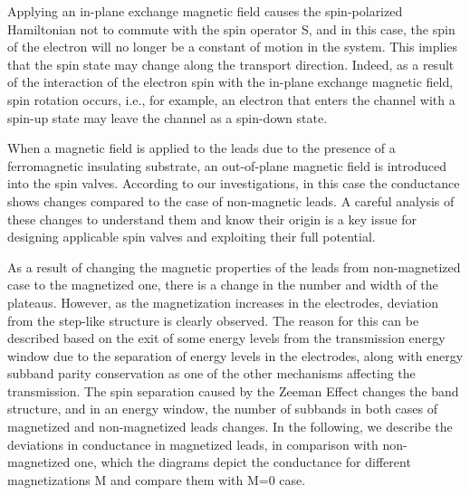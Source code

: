 \documentclass[twoside,twocolumn,9pt]{article}
\begin{document}
Applying an in-plane exchange magnetic field causes the spin-polarized Hamiltonian not to commute with the spin operator S, and in this case, the spin of the electron will no longer be a constant of motion in the system. This implies that the spin state may change along the transport direction. Indeed, as a result of the interaction of the electron spin with the in-plane exchange magnetic field, spin rotation occurs, i.e., for example, an electron that enters the channel with a spin-up state may leave the channel as a spin-down state. 

When a magnetic field is applied to the leads due to the presence of a ferromagnetic insulating substrate, an out-of-plane magnetic field is introduced into the spin valves. According to our investigations, in this case the conductance shows changes compared to the case of non-magnetic leads. A careful analysis of these changes to understand them and know their origin is a key issue for designing applicable spin valves and exploiting their full potential.

As a result of changing the magnetic properties of the leads from non-magnetized case to the magnetized one, there is a change in the number and width of the plateaus. However, as the magnetization increases in the electrodes, deviation from the step-like structure is clearly observed. The reason for this can be described based on the exit of some energy levels from the transmission energy window due to the separation of energy levels in the electrodes, along with energy subband parity conservation as one of the other mechanisms affecting the transmission. The spin separation caused by the Zeeman Effect changes the band structure, and in an energy window, the number of subbands in both cases of magnetized and non-magnetized leads changes. In the following, we describe the deviations in conductance in magnetized leads, in comparison with non-magnetized one, which the diagrams depict the conductance for different magnetizations M and compare them with M=0 case.
\end{document}
